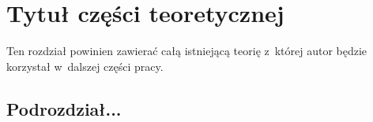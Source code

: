\chapter{Tytuł części teoretycznej}\label{chap:teoria}
Ten rozdział powinien zawierać całą istniejącą teorię z~której autor będzie korzystał w~dalszej części pracy.

\section{Podrozdział...}